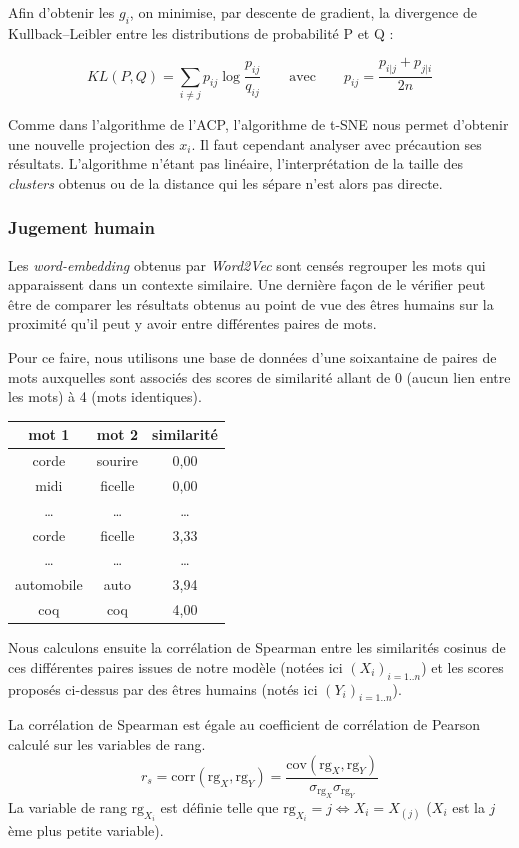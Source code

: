 \documentclass[11pt,french,french]{article}
\begin{document}
Afin d'obtenir les \(g_i\), on minimise, par descente de gradient, la
divergence de Kullback--Leibler entre les distributions de probabilité P
et Q :

\[KL(P,Q) = \sum_{i \neq j} { p_{ij} \log{\frac{p_{ij}}{q_{ij}}}} \qquad\text{avec}\qquad p_{ij} = \frac{p_{i|j} + p_{j|i}}{2n}\]

Comme dans l'algorithme de l'ACP, l'algorithme de t-SNE nous permet
d'obtenir une nouvelle projection des \(x_i\). Il faut cependant
analyser avec précaution ses résultats. L'algorithme n'étant pas
linéaire, l'interprétation de la taille des \emph{clusters} obtenus ou
de la distance qui les sépare n'est alors pas directe.

\hypertarget{jugement-humain}{%
\subsubsection{Jugement humain}\label{jugement-humain}}

\label{sec:jugement_humain}

Les \emph{word-embedding} obtenus par \emph{Word2Vec} sont censés
regrouper les mots qui apparaissent dans un contexte similaire. Une
dernière façon de le vérifier peut être de comparer les résultats
obtenus au point de vue des êtres humains sur la proximité qu'il peut y
avoir entre différentes paires de mots.

Pour ce faire, nous utilisons une base de données d'une soixantaine de
paires de mots auxquelles sont associés des scores de similarité allant
de 0 (aucun lien entre les mots) à 4 (mots identiques).

\begin{tabular}{|c|c|c|}
    \hline
    mot 1 & mot 2 & similarité  \tabularnewline
    \hline
    corde & sourire & 0,00   \tabularnewline
    midi & ficelle & 0,00   \tabularnewline
    \dots & \dots & \dots   \tabularnewline
    corde & ficelle & 3,33   \tabularnewline
    \dots & \dots & \dots   \tabularnewline
    automobile & auto & 3,94   \tabularnewline
    coq & coq & 4,00   \tabularnewline
    \hline
 \end{tabular}

Nous calculons ensuite la corrélation de Spearman entre les similarités
cosinus de ces différentes paires issues de notre modèle (notées ici
\((X_i)_{i=1..n}\)) et les scores proposés ci-dessus par des êtres
humains (notés ici \((Y_i)_{i=1..n}\)).

La corrélation de Spearman est égale au coefficient de corrélation de
Pearson calculé sur les variables de rang. \[
r_s = \mathrm{corr}(\mathrm{rg}_X, \mathrm{rg}_Y) = 
\frac{\mathrm{cov}(\mathrm{rg}_X, \mathrm{rg}_Y)}{
\sigma_{\mathrm{rg}_X} \sigma_{\mathrm{rg}_Y}
}
\] La variable de rang \(\mathrm{rg}_{X_i}\) est définie telle que
\(\mathrm{rg}_{X_i}=j \iff X_i = X_{(j)}\) (\(X_i\) est la \(j\)ème plus
petite variable).
\end{document}
